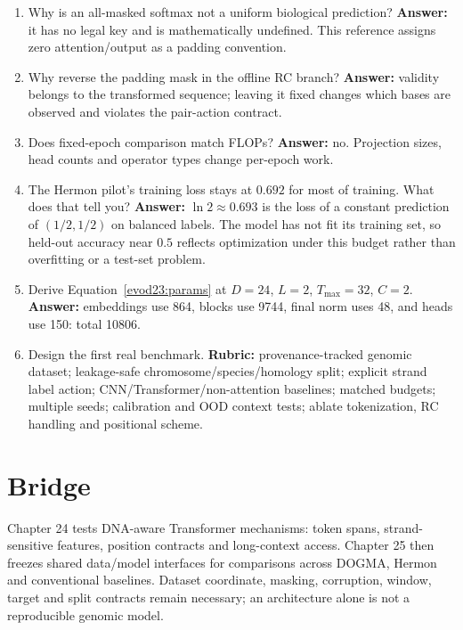 \begin{enumerate}
is $(a,2(1-a))$.
\item Why is an all-masked softmax not a uniform biological prediction?
\textbf{Answer:} it has no legal key and is mathematically undefined.
This reference assigns zero attention/output as a padding convention.
\item Why reverse the padding mask in the offline RC branch?
\textbf{Answer:} validity belongs to the transformed sequence; leaving it fixed
changes which bases are observed and violates the pair-action contract.
\item Does fixed-epoch comparison match FLOPs? \textbf{Answer:} no.
Projection sizes, head counts and operator types change per-epoch work.
\item The Hermon pilot's training loss stays at $0.692$ for most of training.
What does that tell you? \textbf{Answer:} $\ln2\approx0.693$ is the loss of a
constant prediction of $(1/2,1/2)$ on balanced labels. The model has not fit its
training set, so held-out accuracy near $0.5$ reflects optimization under this budget
rather than overfitting or a test-set problem.
\item Derive Equation~\ref{evod23:params} at $D=24$, $L=2$, $T_{\max}=32$,
$C=2$. \textbf{Answer:} embeddings use 864, blocks use 9744, final norm
uses 48, and heads use 150: total 10806.
\item Design the first real benchmark. \textbf{Rubric:} provenance-tracked genomic
dataset; leakage-safe chromosome/species/homology split; explicit strand label
action; CNN/Transformer/non-attention baselines; matched budgets; multiple seeds;
calibration and OOD context tests; ablate tokenization, RC handling and positional
scheme.
\end{enumerate}

\section{Bridge}
Chapter 24 tests DNA-aware Transformer mechanisms: token spans, strand-sensitive
features, position contracts and long-context access. Chapter 25 then freezes
shared data/model interfaces for comparisons across DOGMA, Hermon and conventional
baselines. Dataset coordinate, masking, corruption, window, target and split
contracts remain necessary; an architecture alone is not a reproducible genomic model.
